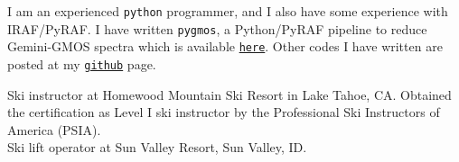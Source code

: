 \documentclass[11pt]{article}
\begin{document}

I am an experienced \texttt{python} programmer, and I also have some experience 
with IRAF/PyRAF. I have written {\tt pygmos}, a Python/PyRAF pipeline to reduce 
Gemini-GMOS spectra which is available 
\href{https://github.com/cristobal-sifon/pygmos/}{\texttt{here}}. Other codes I 
have written are posted at my 
\href{https://github.com/cristobal-sifon}{\texttt{github}} page.\\



\noindent
{} Ski instructor at Homewood Mountain Ski Resort in Lake Tahoe, CA. Obtained the certification as Level I ski instructor  by the Professional Ski Instructors of America (PSIA).\\
 Ski lift operator at Sun Valley Resort, Sun Valley, ID.\\

\hline
\vspace{0.5cm}

\pagebreak


\end{document}
